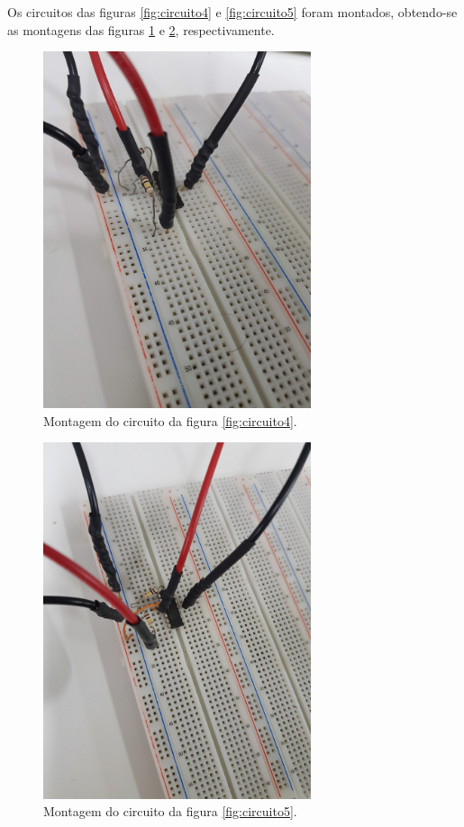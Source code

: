 \documentclass{abntex2}
\begin{document}
Os circuitos das figuras \ref{fig:circuito4} e \ref{fig:circuito5} foram montados, obtendo-se as montagens das figuras \ref{fig:montagem5} e \ref{fig:montagem6}, respectivamente.

\begin{figure}[h]
  \centering
  \includegraphics[width = 0.7\textwidth]{circ_3.jpg}
  \caption{Montagem do circuito da figura \ref{fig:circuito4}.}
  \label{fig:montagem5}
\end{figure}
\begin{figure}[h]
  \centering
  \includegraphics[width = 0.7\textwidth]{circ_4.jpg}
  \caption{Montagem do circuito da figura \ref{fig:circuito5}.}
  \label{fig:montagem6}
\end{figure}
\end{document}
